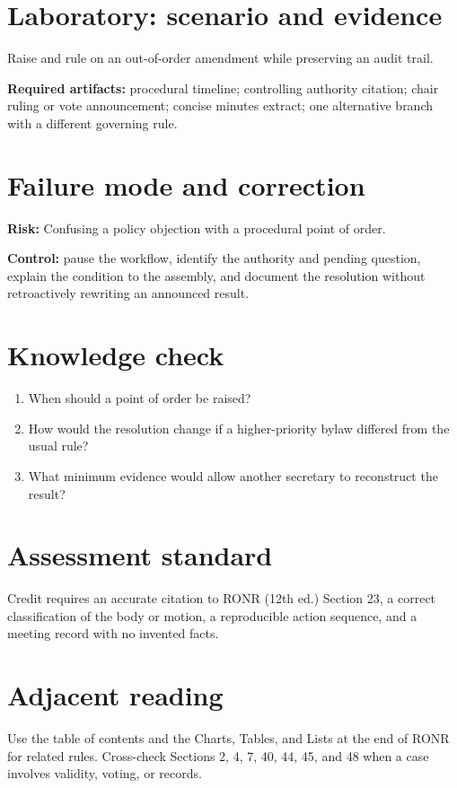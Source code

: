 \documentclass[11pt]{article}
\begin{document}
\section{Laboratory: scenario and evidence}
Raise and rule on an out-of-order amendment while preserving an audit trail.

\textbf{Required artifacts:} procedural timeline; controlling authority citation; chair ruling or vote announcement; concise minutes extract; one alternative branch with a different governing rule.

\section{Failure mode and correction}
\textbf{Risk:} Confusing a policy objection with a procedural point of order.

\textbf{Control:} pause the workflow, identify the authority and pending question, explain the condition to the assembly, and document the resolution without retroactively rewriting an announced result.

\section{Knowledge check}
\begin{enumerate}[leftmargin=*,itemsep=4pt]
\item When should a point of order be raised?
\item How would the resolution change if a higher-priority bylaw differed from the usual rule?
\item What minimum evidence would allow another secretary to reconstruct the result?
\end{enumerate}

\section{Assessment standard}
Credit requires an accurate citation to RONR (12th ed.) Section 23, a correct classification of the body or motion, a reproducible action sequence, and a meeting record with no invented facts.

\section{Adjacent reading}
Use the table of contents and the Charts, Tables, and Lists at the end of RONR for related rules. Cross-check Sections 2, 4, 7, 40, 44, 45, and 48 when a case involves validity, voting, or records.
\end{document}
